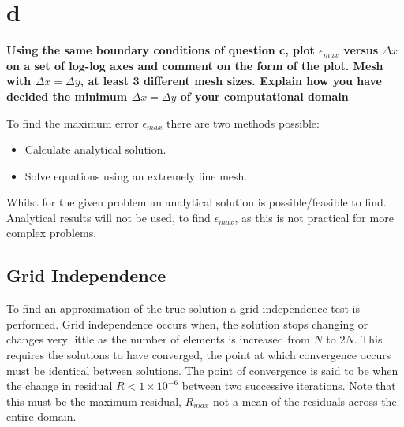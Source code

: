 \documentclass[10pt, a4paper]{article}
\begin{document}
\section*{d}
\textbf{Using the same boundary conditions of question c, plot $\epsilon_{max}$ versus $\Delta x$ on a set of log-log axes and comment on the form of the plot. Mesh with $\Delta x = \Delta y$, at least 3 different mesh sizes.  Explain how you have decided the minimum $\Delta x = \Delta y$ of your computational domain}

To find the maximum error $\epsilon_{max}$ there are two methods possible:
\begin{itemize}
	\item Calculate analytical solution.
	\item Solve equations using an extremely fine mesh.
\end{itemize}

Whilst for the given problem an analytical solution is possible/feasible to find. Analytical results will not be used, to find $\epsilon_{max}$, as this is not practical for more complex problems.

\subsection*{Grid Independence}
To find an approximation of the true solution a grid independence test is performed. Grid independence occurs when, the solution stops changing or changes very little as the number of elements is increased from $N$ to $2N$. This requires the solutions to have converged, the point at which convergence occurs must be identical between solutions. The point of convergence is said to be when the change in residual $R < 1 \times 10^{-6}$ between two successive iterations. Note that this must be the maximum residual, $R_{max}$ not a mean of the residuals across the entire domain.
\end{document}
